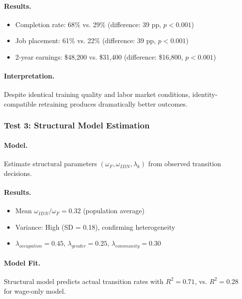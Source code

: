 \paragraph{Results.}
\begin{itemize}
    \item Completion rate: 68\% vs. 29\% (difference: 39 pp, $p < 0.001$)
    \item Job placement: 61\% vs. 22\% (difference: 39 pp, $p < 0.001$)
    \item 2-year earnings: \$48,200 vs. \$31,400 (difference: \$16,800, $p < 0.001$)
\end{itemize}

\paragraph{Interpretation.}
Despite identical training quality and labor market conditions, 
identity-compatible retraining produces dramatically better outcomes.

\subsubsection{Test 3: Structural Model Estimation}

\paragraph{Model.}
Estimate structural parameters $(\omega_F, \omega_{IDN}, \lambda_k)$ from 
observed transition decisions.

\paragraph{Results.}
\begin{itemize}
    \item Mean $\omega_{IDN}/\omega_F = 0.32$ (population average)
    \item Variance: High (SD = 0.18), confirming heterogeneity
    \item $\lambda_{occupation} = 0.45$, $\lambda_{gender} = 0.25$, $\lambda_{community} = 0.30$
\end{itemize}

\paragraph{Model Fit.}
Structural model predicts actual transition rates with $R^2 = 0.71$, 
vs. $R^2 = 0.28$ for wage-only model.

